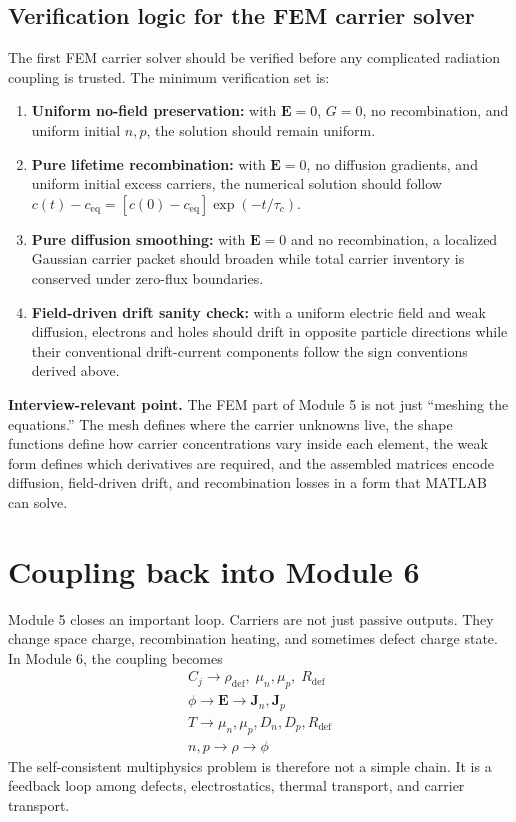 \documentclass[11pt]{article}
\newcommand{\Evec}{\bm{E}}
\newcommand{\Jvec}{\bm{J}}
\begin{document}
\subsection{Verification logic for the FEM carrier solver}

The first FEM carrier solver should be verified before any complicated radiation coupling is trusted. The minimum verification set is:
\begin{enumerate}[leftmargin=1.6em]
    \item \textbf{Uniform no-field preservation:} with \(\mathbf{E}=0\), \(G=0\), no recombination, and uniform initial \(n,p\), the solution should remain uniform.
    \item \textbf{Pure lifetime recombination:} with \(\mathbf{E}=0\), no diffusion gradients, and uniform initial excess carriers, the numerical solution should follow \(c(t)-c_{\mathrm{eq}}=[c(0)-c_{\mathrm{eq}}]\exp(-t/\tau_c)\).
    \item \textbf{Pure diffusion smoothing:} with \(\mathbf{E}=0\) and no recombination, a localized Gaussian carrier packet should broaden while total carrier inventory is conserved under zero-flux boundaries.
    \item \textbf{Field-driven drift sanity check:} with a uniform electric field and weak diffusion, electrons and holes should drift in opposite particle directions while their conventional drift-current components follow the sign conventions derived above.
\end{enumerate}

\begin{notebox}
\textbf{Interview-relevant point.} The FEM part of Module 5 is not just ``meshing the equations.'' The mesh defines where the carrier unknowns live, the shape functions define how carrier concentrations vary inside each element, the weak form defines which derivatives are required, and the assembled matrices encode diffusion, field-driven drift, and recombination losses in a form that MATLAB can solve.
\end{notebox}

\section{Coupling back into Module 6}

Module 5 closes an important loop. Carriers are not just passive outputs. They change space charge, recombination heating, and sometimes defect charge state. In Module 6, the coupling becomes
\begin{equation}
\boxed{
\begin{array}{c}
C_j \rightarrow \rho_{\mathrm{def}},\; \mu_n,\mu_p,\; R_{\mathrm{def}} \\
\phi \rightarrow \Evec \rightarrow \Jvec_n,\Jvec_p \\
T \rightarrow \mu_n,\mu_p,D_n,D_p,R_{\mathrm{def}} \\
n,p \rightarrow \rho \rightarrow \phi
\end{array}}
\end{equation}
The self-consistent multiphysics problem is therefore not a simple chain. It is a feedback loop among defects, electrostatics, thermal transport, and carrier transport.
\end{document}

